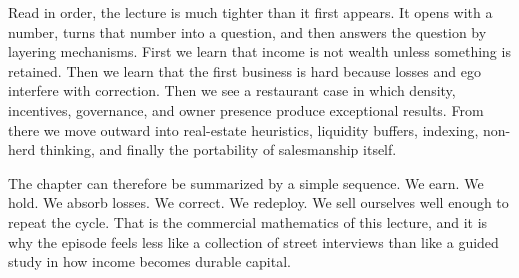 Read in order, the lecture is much tighter than it first appears. It opens with a number, turns that number into a question, and then answers the question by layering mechanisms. First we learn that income is not wealth unless something is retained. Then we learn that the first business is hard because losses and ego interfere with correction. Then we see a restaurant case in which density, incentives, governance, and owner presence produce exceptional results. From there we move outward into real-estate heuristics, liquidity buffers, indexing, non-herd thinking, and finally the portability of salesmanship itself.

The chapter can therefore be summarized by a simple sequence. We earn. We hold. We absorb losses. We correct. We redeploy. We sell ourselves well enough to repeat the cycle. That is the commercial mathematics of this lecture, and it is why the episode feels less like a collection of street interviews than like a guided study in how income becomes durable capital.